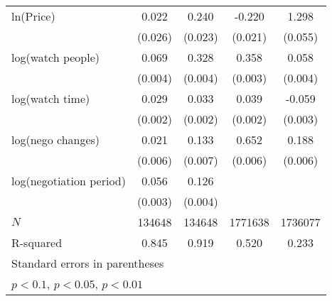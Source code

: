 {\begin{tabular}{l*{4}{c}}
\addlinespace
ln(Price)&       0.022         &       0.240\sym{***}&      -0.220\sym{***}&       1.298\sym{***}\\
            &     (0.026)         &     (0.023)         &     (0.021)         &     (0.055)         \\
\addlinespace
log(watch people)&       0.069\sym{***}&       0.328\sym{***}&       0.358\sym{***}&       0.058\sym{***}\\
            &     (0.004)         &     (0.004)         &     (0.003)         &     (0.004)         \\
\addlinespace
log(watch time)&       0.029\sym{***}&       0.033\sym{***}&       0.039\sym{***}&      -0.059\sym{***}\\
            &     (0.002)         &     (0.002)         &     (0.002)         &     (0.003)         \\
\addlinespace
log(nego changes)&       0.021\sym{***}&       0.133\sym{***}&       0.652\sym{***}&       0.188\sym{***}\\
            &     (0.006)         &     (0.007)         &     (0.006)         &     (0.006)         \\
\addlinespace
log(negotiation period)&       0.056\sym{***}&       0.126\sym{***}&                     &                     \\
            &     (0.003)         &     (0.004)         &                     &                     \\
\midrule
\(N\)       &      134648         &      134648         &     1771638         &     1736077         \\
R-squared   &       0.845         &       0.919         &       0.520         &       0.233         \\
\bottomrule
\multicolumn{5}{l}{\footnotesize Standard errors in parentheses}\\
\multicolumn{5}{l}{\footnotesize \sym{*} \(p<0.1\), \sym{**} \(p<0.05\), \sym{***} \(p<0.01\)}\\
\end{tabular}
}

